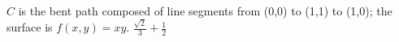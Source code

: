 {$C$ is the bent path composed of line segments from (0,0) to (1,1) to (1,0); the surface is $f(x,y)=xy$. 
}
{$\frac{\sqrt{2}}{3} + \frac{1}{2}$}
